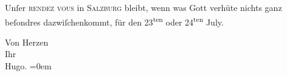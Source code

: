 \pstart
           Unſer \textsc{rendez vous} in \textsc{Salzburg} bleibt, wenn was Gott verhüte nichts ganz beſondres dazwiſchenkommt, für den
                     23\textsuperscript{ten} oder 24\textsuperscript{ten} July.\pend
           
\pstart
           Von Herzen{\\[\baselineskip]}Ihr{\\[\baselineskip]}\spacefill\mbox{Hugo.}\pend
           \leftskip=0em{}\endnumbering{}  
      